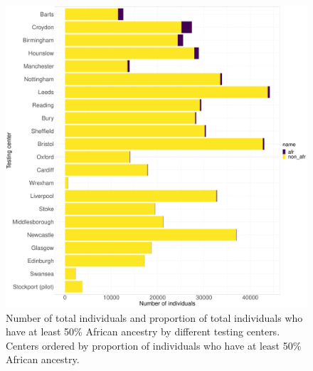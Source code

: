 \begin{figure}[htp]
    \centering
    \includegraphics[width=1.0\textwidth]{../images/appendix/testing_centre_afr_prop.pdf}
    \caption{Number of total individuals and proportion of total individuals who have at least 50\% African ancestry by different testing centers. Centers ordered by proportion of individuals who have at least 50\% African ancestry.}
    \label{fig:haplotype_map_Caribbean}
\end{figure}

